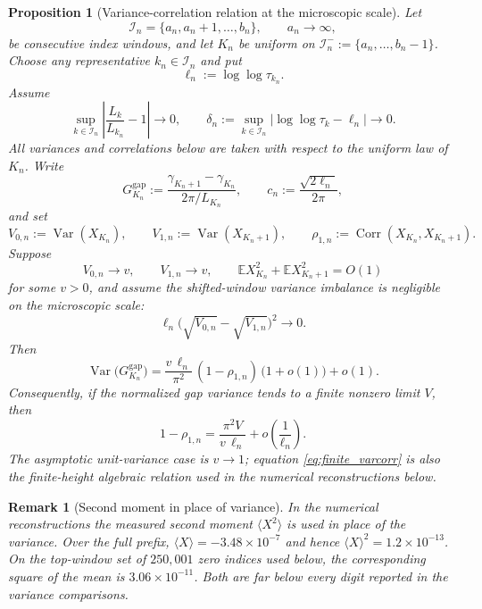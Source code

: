 \documentclass[pdflatex,sn-mathphys-num]{sn-jnl}
\numberwithin{equation}{section}
\theoremstyle{thmstyleone}
\newtheorem{proposition}[theorem]{Proposition}
\theoremstyle{thmstylethree}
\theoremstyle{thmstyletwo}
\newtheorem{remark}[theorem]{Remark}
\newcommand{\E}{\mathbb E}
\newcommand{\Var}{\operatorname{Var}}
\newcommand{\Corr}{\operatorname{Corr}}
\newcommand{\1}{\mathbf 1}
\begin{document}
\begin{proposition}[Variance-correlation relation at the microscopic scale]
\label{prop:varcorr}
Let
\[
 \mathcal I_n=\{a_n,a_n+1,\ldots,b_n\},
 \qquad a_n\longrightarrow\infty,
\]
be consecutive index windows, and let $K_n$ be uniform on
$\mathcal I_n^-:=\{a_n,\ldots,b_n-1\}$.  Choose any representative
$k_n\in\mathcal I_n$ and put
\[
 \ell_n:=\log\log\tau_{k_n}.
\]
Assume
\begin{equation}
 \sup_{k\in\mathcal I_n}
 \left|\frac{L_k}{L_{k_n}}-1\right|\longrightarrow0,
 \qquad
 \delta_n:=
 \sup_{k\in\mathcal I_n}
 \left|\log\log\tau_k-\ell_n\right|
 \longrightarrow0.
\label{eq:local_window_constancy}
\end{equation}
All variances and correlations below are taken with respect to the uniform
law of $K_n$.  Write
\[
 G_{K_n}^{\mathrm{gap}}
 :=
 \frac{\gamma_{K_n+1}-\gamma_{K_n}}{2\pi/L_{K_n}},
 \qquad
 c_n:=\frac{\sqrt{2\ell_n}}{2\pi},
\]
and set
\[
 V_{0,n}:=\Var(X_{K_n}),
 \qquad
 V_{1,n}:=\Var(X_{K_n+1}),
 \qquad
 \rho_{1,n}:=\Corr(X_{K_n},X_{K_n+1}).
\]
Suppose
\[
 V_{0,n}\longrightarrow v,
 \qquad
 V_{1,n}\longrightarrow v,
 \qquad
 \E X_{K_n}^2+\E X_{K_n+1}^2=O(1)
\]
for some $v>0$, and assume the shifted-window variance imbalance is negligible
on the microscopic scale:
\begin{equation}
 \ell_n\bigl(\sqrt{V_{0,n}}-\sqrt{V_{1,n}}\bigr)^2\longrightarrow0.
\label{eq:local_variance_balance}
\end{equation}
Then
\begin{equation}
 \Var\bigl(G_{K_n}^{\mathrm{gap}}\bigr)
 =
 \frac{v\,\ell_n}{\pi^2}\,(1-\rho_{1,n})
 \,\bigl(1+o(1)\bigr)+o(1).
\label{eq:finite_varcorr}
\end{equation}
Consequently, if the normalized gap variance tends to a finite nonzero limit
$V$, then
\[
 1-\rho_{1,n}
 =
 \frac{\pi^2V}{v\,\ell_n}
 +o\!\left(\frac1{\ell_n}\right).
\]
The asymptotic unit-variance case is $v\to1$; equation
\eqref{eq:finite_varcorr} is also the finite-height algebraic relation used
in the numerical reconstructions below.
\end{proposition}

\begin{remark}[Second moment in place of variance]
In the numerical reconstructions the measured second moment
$\langle X^2\rangle$ is used in place of the variance.  Over the full prefix,
$\langle X\rangle=-3.48\times10^{-7}$ and hence
$\langle X\rangle^2=1.2\times10^{-13}$.  On the top-window set of
$250{,}001$ zero indices used below, the corresponding square of the mean is
$3.06\times10^{-11}$.  Both are far below every digit reported in the variance
comparisons.
\end{remark}
\end{document}
